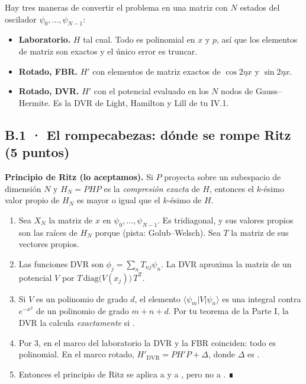 Hay tres maneras de convertir el problema en una matriz con $N$ estados del oscilador $\psi_0, \ldots, \psi_{N-1}$:
\begin{itemize}
\tightlist
\item \textbf{Laboratorio.} $H$ tal cual. Todo es polinomial en $x$ y $p$, así que los elementos de matriz son exactos y el único error es truncar.
\item \textbf{Rotado, FBR.} $H'$ con elementos de matriz exactos de $\cos 2\eta x$ y $\sin 2\eta x$.
\item \textbf{Rotado, DVR.} $H'$ con el potencial evaluado en los $N$ nodos de Gauss--Hermite. Es la DVR de Light, Hamilton y Lill de tu IV.1.
\end{itemize}

\subsection{B.1 · El rompecabezas: dónde se rompe Ritz (5 puntos)}

\textbf{Principio de Ritz (lo aceptamos).} Si $P$ proyecta sobre un subespacio de dimensión $N$ y $H_N = PHP$ es la \emph{compresión exacta} de $H$, entonces el $k$-ésimo valor propio de $H_N$ es mayor o igual que el $k$-ésimo de $H$.

\begin{enumerate}
\def\labelenumi{\arabic{enumi}.}
\item Sea $X_N$ la matriz de $x$ en $\psi_0, \ldots, \psi_{N-1}$. Es tridiagonal, y sus valores propios son las raíces de $H_N$ porque  (pista: Golub--Welsch). Sea $T$ la matriz de sus vectores propios.
\item Las funciones DVR son $\phi_j = \sum_n T_{nj}\psi_n$. La DVR aproxima la matriz de un potencial $V$ por $T\,\mathrm{diag}\bigl(V(x_j)\bigr)\,T^{\mathsf T}$.
\item Si $V$ es un polinomio de grado $d$, el elemento $\langle\psi_m|V|\psi_n\rangle$ es una integral contra $e^{-x^2}$ de un polinomio de grado $m + n + d$. Por tu teorema de la Parte I, la DVR la calcula \emph{exactamente} si .
\item Por 3, en el marco del laboratorio la DVR y la FBR coinciden: todo es polinomial. En el marco rotado, $H'_{\mathrm{DVR}} = PH'P + \Delta$, donde $\Delta$ es .
\item Entonces el principio de Ritz se aplica a  y a , pero no a . ∎
\end{enumerate}

